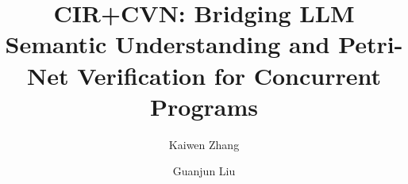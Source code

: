 \documentclass[sigconf]{acmart}
\begin{document}
\title[CIR+CVN for Concurrent Programs]{CIR+CVN: Bridging LLM Semantic Understanding and Petri-Net Verification for Concurrent Programs}

\author{Kaiwen Zhang}

\author{Guanjun Liu}


\begin{abstract}


\end{abstract}
\end{document}
